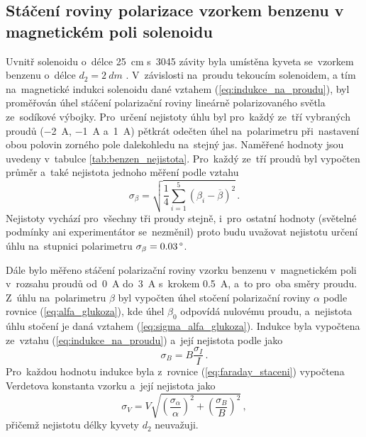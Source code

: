 \documentclass{../concepts/titul_protokol_p/prepareprotokol} %
\newcommand{\relative}[1]{
\frac{\sigma_{#1}}{#1}
}
\newcommand{\squared}[1]{
\left( #1 \right)^2
}
\newcommand{\relsqr}[1]{
\squared{\relative{#1}}
}
\begin{document}
\subsection{Stáčení roviny polarizace vzorkem benzenu v magnetickém poli solenoidu}

Uvnitř solenoidu o~délce \qty{25}{cm} s~3045 závity byla umístěna kyveta se~vzorkem benzenu o~délce 
$d_2 = \qty{2}{dm}$ \cite{pokyny}. V~závislosti na~proudu tekoucím solenoidem, a tím na~magnetické indukci solenoidu
dané vztahem (\ref{eq:indukce_na_proudu}), byl proměřován úhel stáčení polarizační roviny lineárně polarizovaného
světla ze~sodíkové výbojky. Pro~určení nejistoty úhlu byl pro~každý ze~tří vybraných proudů (\qty{-2}{A}, \qty{-1}{A}
a~\qty{1}{A}) pětkrát odečten úhel na~polarimetru při~nastavení obou polovin zorného pole dalekohledu na~stejný jas.
Naměřené hodnoty jsou uvedeny v~tabulce \ref{tab:benzen_nejistota}. Pro~každý ze~tří proudů byl vypočten průměr
a~také nejistota jednoho měření podle vztahu \cite{englich}
\begin{equation}
    \label{eq:sigma_beta_benzen}
    \sigma_{\beta} = \sqrt{ \frac{1}{4} \sum_{i=1}^{5} \left( \beta_i - \overline{\beta} \right)^2 } \,.
\end{equation}
Nejistoty vychází pro~všechny tři proudy stejně, i~pro~ostatní hodnoty (světelné podmínky ani experimentátor 
se~nezměnil) proto budu uvažovat nejistotu určení
úhlu na~stupnici polarimetru $\sigma_\beta = 0.03 \,\degree$.

Dále bylo měřeno stáčení polarizační roviny vzorku benzenu v~magnetickém poli v~rozsahu proudů od~\qty{0}{A} 
do~\qty{3}{A} s~krokem \qty{0.5}{A}, a~to pro~oba směry
proudu. Z~úhlu na~polarimetru $\beta$ byl vypočten úhel stočení polarizační roviny $\alpha$ podle rovnice 
(\ref{eq:alfa_glukoza}), kde úhel $\beta_0$ odpovídá nulovému proudu, a~nejistota úhlu stočení je daná vztahem 
(\ref{eq:sigma_alfa_glukoza}).
Indukce byla vypočtena ze~vztahu (\ref{eq:indukce_na_proudu}) a~její nejistota podle \cite{englich}
jako
\begin{equation}
    \label{eq:sigma_indukce}
    \sigma_B = B \relative{I} \,.
\end{equation}
Pro~každou hodnotu indukce byla z~rovnice (\ref{eq:faraday_staceni}) vypočtena Verdetova konstanta vzorku
a~její nejistota jako \cite{englich}
\begin{equation}
    \label{eq:sigma_verdet}
    \sigma_V = V \sqrt{ \relsqr{\alpha} + \relsqr{B}} \,,
\end{equation}
přičemž nejistotu délky kyvety $d_2$ neuvažuji.
\end{document}
